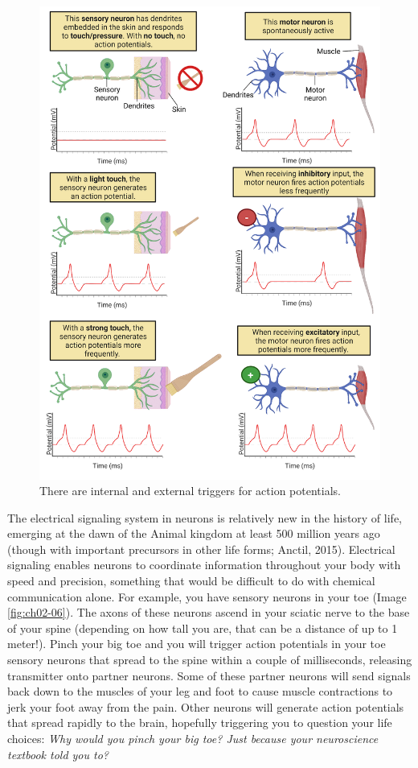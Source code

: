 \documentclass[
]{book}
\begin{document}
\begin{figure}

{\centering \includegraphics[width=0.9\linewidth]{images/ch02/02_05} 

}

\caption{There are internal and external triggers for action potentials.}\label{fig:ch02-05}
\end{figure}

The electrical signaling system in neurons is relatively new in the history of life, emerging at the dawn of the Animal kingdom at least 500 million years ago (though with important precursors in other life forms; Anctil, 2015). Electrical signaling enables neurons to coordinate information throughout your body with speed and precision, something that would be difficult to do with chemical communication alone. For example, you have sensory neurons in your toe (Image \ref{fig:ch02-06}). The axons of these neurons ascend in your sciatic nerve to the base of your spine (depending on how tall you are, that can be a distance of up to 1 meter!). Pinch your big toe and you will trigger action potentials in your toe sensory neurons that spread to the spine within a couple of milliseconds, releasing transmitter onto partner neurons. Some of these partner neurons will send signals back down to the muscles of your leg and foot to cause muscle contractions to jerk your foot away from the pain. Other neurons will generate action potentials that spread rapidly to the brain, hopefully triggering you to question your life choices: \emph{Why would you pinch your big toe? Just because your neuroscience textbook told you to?}
\end{document}
